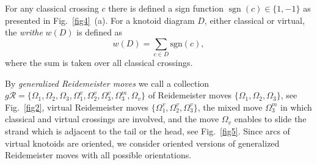\documentclass[11pt]{amsart}
\theoremstyle{noparens}
\numberwithin{equation}{section}
\numberwithin{equation}{section}
\begin{document}
For any classical crossing $c$ there is defined a sign function $\operatorname{sgn}(c) \in \{ 1,-1\}$ as presented in Fig.~\ref{fig4}~(a). For a knotoid diagram $D$, either classical or virtual, the \textit{writhe} $w(D)$ is defined as 
\begin{equation}
w(D) = \sum_{c \in D} \mathrm{sgn} (c), 
\end{equation}
where the sum is taken over all classical crossings.


By \textit{generalized Reidemeister moves} we call a collection 
$
\textit{g} \mathcal{R} = \{ \Omega_1, \Omega_2, \Omega_3, \Omega_1^v, \Omega_2^v, \Omega_3^v, \Omega_3^m, \Omega_v \} 
$  
of Reidemeister moves $\{\Omega_1, \Omega_2, \Omega_3\}$, see Fig.~\ref{fig2}, virtual Reidemeister moves $\{ \Omega_1^v, \Omega_2^v, \Omega_3^v\}$, the mixed move $\Omega_3^{m}$ in which classical and virtual crossings are involved, and the move $\Omega_v$ enables to slide the strand which is adjacent to the tail or the head, see Fig.~\ref{fig5}. Since arcs of virtual knotoids are oriented, we consider oriented versions of generalized Reidemeister moves with all possible orientations.  
\end{document}
